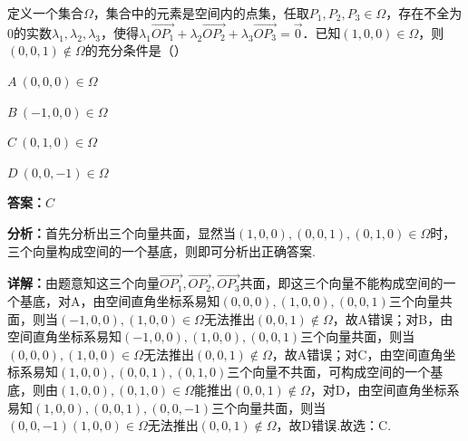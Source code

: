 \begin{question}[points=5]
定义一个集合$\Omega$，集合中的元素是空间内的点集，任取$P_1,P_2,P_3\in\Omega$，存在不全为0的实数$\lambda_1,\lambda_2,\lambda_3$，使得$\lambda_1\overrightarrow{OP_1}+\lambda_2\overrightarrow{OP_2}+\lambda_3\overrightarrow{OP_3}=\vec{0}$．已知$(1,0,0)\in\Omega$，则$(0,0,1)\notin\Omega$的充分条件是（\quad\quad）
\begin{choices}
  \item $A\ (0,0,0)\in\Omega$
  \item $B\ (-1,0,0)\in\Omega$
  \item $C\ (0,1,0)\in\Omega$
  \item $D\ (0,0,-1)\in\Omega$
\end{choices}
\begin{solution}
\textbf{答案：}$C$

\textbf{分析：}首先分析出三个向量共面，显然当$(1,0,0),(0,0,1),(0,1,0)\in\Omega$时，三个向量构成空间的一个基底，则即可分析出正确答案.

\textbf{详解：}由题意知这三个向量$\overrightarrow{OP_1},\overrightarrow{OP_2},\overrightarrow{OP_3}$共面，即这三个向量不能构成空间的一个基底，对A，由空间直角坐标系易知$(0,0,0),(1,0,0),(0,0,1)$三个向量共面，则当$(-1,0,0),(1,0,0)\in\Omega$无法推出$(0,0,1)\notin\Omega$，故A错误；对B，由空间直角坐标系易知$(-1,0,0),(1,0,0),(0,0,1)$三个向量共面，则当$(0,0,0),(1,0,0)\in\Omega$无法推出$(0,0,1)\notin\Omega$，故A错误；对C，由空间直角坐标系易知$(1,0,0),(0,0,1),(0,1,0)$三个向量不共面，可构成空间的一个基底，则由$(1,0,0),(0,1,0)\in\Omega$能推出$(0,0,1)\notin\Omega$，对D，由空间直角坐标系易知$(1,0,0),(0,0,1),(0,0,-1)$三个向量共面，则当$(0,0,-1)(1,0,0)\in\Omega$无法推出$(0,0,1)\notin\Omega$，故D错误.故选：C.
\end{solution}
\end{question}

